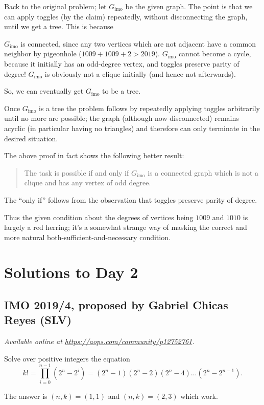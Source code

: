 \documentclass[11pt]{scrartcl}
\begin{document}
Back to the original problem;
let $G_{\text{imo}}$ be the given graph.
The point is that we can apply toggles (by the claim) repeatedly,
without disconnecting the graph, until we get a tree.
This is because
\begin{itemize}
  \ii $G_{\text{imo}}$ is connected,
  since any two vertices which are not adjacent
  have a common neighbor by pigeonhole
  ($1009 + 1009 + 2 > 2019$).
  \ii $G_{\text{imo}}$ cannot become a cycle,
  because it initially has an odd-degree vertex,
  and toggles preserve parity of degree!
  \ii $G_{\text{imo}}$ is obviously not a clique initially
  (and hence not afterwards).
\end{itemize}
So, we can eventually get $G_{\text{imo}}$ to be a tree.

Once $G_{\text{imo}}$ is a tree the problem follows by repeatedly applying
toggles arbitrarily until no more are possible;
the graph (although now disconnected) remains acyclic
(in particular having no triangles)
and therefore can only terminate in the desired situation.

\begin{remark*}
  The above proof in fact shows the following better result:
  \begin{quote}
  The task is possible if and only if
  $G_{\text{imo}}$ is a connected graph which is not a clique
  and has any vertex of odd degree.
  \end{quote}
  The ``only if'' follows from the observation
  that toggles preserve parity of degree.

  Thus the given condition about the degrees of vertices
  being $1009$ and $1010$ is largely a red herring;
  it's a somewhat strange way of masking the correct and more natural
  both-sufficient-and-necessary condition.
\end{remark*}
\pagebreak

\section{Solutions to Day 2}
\subsection{IMO 2019/4, proposed by Gabriel Chicas Reyes (SLV)}
\textsl{Available online at \url{https://aops.com/community/p12752761}.}
\begin{mdframed}[style=mdpurplebox,frametitle={Problem statement}]
Solve over positive integers the equation
\[ k! = \prod_{i=0}^{n-1} (2^n-2^i)
  = (2^n-1)(2^n-2)(2^n-4) \dots (2^n-2^{n-1}). \]
\end{mdframed}
The answer is $(n,k) =(1,1)$ and $(n,k) = (2,3)$ which work.
\end{document}
